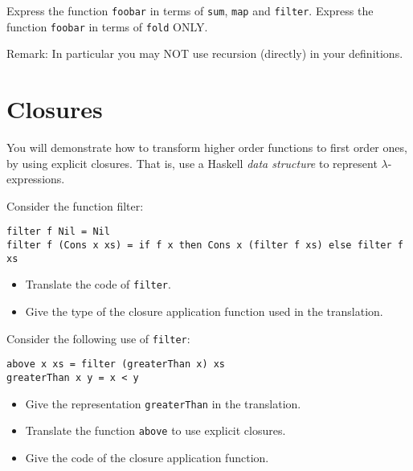\documentclass{article}
\newcommand{\answer}[1]{}
\begin{document}
Express the function \texttt{foobar} in terms of \texttt{sum}, \texttt{map} and \texttt{filter}.
Express the function \texttt{foobar} in terms of \texttt{fold} ONLY.

Remark: In particular you may NOT use recursion (directly) in your definitions.

\answer{
  \begin{verbatim}
  foobar = sum . map (\x -> 7*x+2) . filter (>3)
  foobar = fold 0 f where
     f x acc = if x > 3 then 7*x + 2 + acc else acc    
   \end{verbatim}
}


\newpage
\section{Closures}

You will demonstrate how to transform higher order functions to first order ones,
by using explicit closures.  That is, use a Haskell \emph{data
  structure} to represent $\lambda$-expressions.

Consider the function filter:
\begin{verbatim}
filter f Nil = Nil
filter f (Cons x xs) = if f x then Cons x (filter f xs) else filter f xs
\end{verbatim}

\begin{itemize}
\item Translate the code of \texttt{filter}. 
\item Give the type of the closure application function used in the
  translation. 
\end{itemize}

Consider the following use of \texttt{filter}:
\begin{verbatim}
above x xs = filter (greaterThan x) xs
greaterThan x y = x < y
\end{verbatim}

\begin{itemize}
\item Give the representation \texttt{greaterThan} in the translation. 
\item Translate the function \texttt{above} to use explicit closures. 
\item Give the code of the closure application function. 
\end{itemize}

\answer{
  \begin{verbatim}
    
1.

  filter f Nil = Nil
  filter f (Cons x xs) = if f `ap` x then Cons x (filter f xs) else filter f xs

2. ap :: Fun -> Int -> Bool

3. 

data Fun = GreaterThan Int 

4. above x y = filter (GreaterThan x) xs

5. ap (GreaterThan x) y = x < y
 
  \end{verbatim}
}
\end{document}
